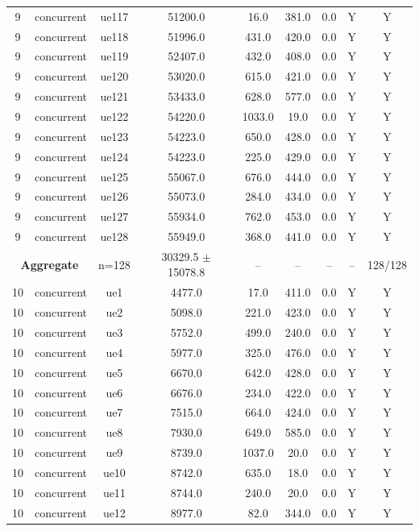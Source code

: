 \begin{table}[ht]
\begin{tabular}{|c|c|c|c|c|c|c|c|c|}
9 & concurrent & ue117 & 51200.0 & 16.0 & 381.0 & 0.0 & Y & Y \\
9 & concurrent & ue118 & 51996.0 & 431.0 & 420.0 & 0.0 & Y & Y \\
9 & concurrent & ue119 & 52407.0 & 432.0 & 408.0 & 0.0 & Y & Y \\
9 & concurrent & ue120 & 53020.0 & 615.0 & 421.0 & 0.0 & Y & Y \\
9 & concurrent & ue121 & 53433.0 & 628.0 & 577.0 & 0.0 & Y & Y \\
9 & concurrent & ue122 & 54220.0 & 1033.0 & 19.0 & 0.0 & Y & Y \\
9 & concurrent & ue123 & 54223.0 & 650.0 & 428.0 & 0.0 & Y & Y \\
9 & concurrent & ue124 & 54223.0 & 225.0 & 429.0 & 0.0 & Y & Y \\
9 & concurrent & ue125 & 55067.0 & 676.0 & 444.0 & 0.0 & Y & Y \\
9 & concurrent & ue126 & 55073.0 & 284.0 & 434.0 & 0.0 & Y & Y \\
9 & concurrent & ue127 & 55934.0 & 762.0 & 453.0 & 0.0 & Y & Y \\
9 & concurrent & ue128 & 55949.0 & 368.0 & 441.0 & 0.0 & Y & Y \\
\multicolumn{2}{|c|}{\textbf{Aggregate}} & n=128 & 30329.5 $\pm$ 15078.8 & -- & -- & -- & -- & 128/128 \\
\hline
10 & concurrent & ue1 & 4477.0 & 17.0 & 411.0 & 0.0 & Y & Y \\
10 & concurrent & ue2 & 5098.0 & 221.0 & 423.0 & 0.0 & Y & Y \\
10 & concurrent & ue3 & 5752.0 & 499.0 & 240.0 & 0.0 & Y & Y \\
10 & concurrent & ue4 & 5977.0 & 325.0 & 476.0 & 0.0 & Y & Y \\
10 & concurrent & ue5 & 6670.0 & 642.0 & 428.0 & 0.0 & Y & Y \\
10 & concurrent & ue6 & 6676.0 & 234.0 & 422.0 & 0.0 & Y & Y \\
10 & concurrent & ue7 & 7515.0 & 664.0 & 424.0 & 0.0 & Y & Y \\
10 & concurrent & ue8 & 7930.0 & 649.0 & 585.0 & 0.0 & Y & Y \\
10 & concurrent & ue9 & 8739.0 & 1037.0 & 20.0 & 0.0 & Y & Y \\
10 & concurrent & ue10 & 8742.0 & 635.0 & 18.0 & 0.0 & Y & Y \\
10 & concurrent & ue11 & 8744.0 & 240.0 & 20.0 & 0.0 & Y & Y \\
10 & concurrent & ue12 & 8977.0 & 82.0 & 344.0 & 0.0 & Y & Y \\

\end{tabular}
\end{table}

